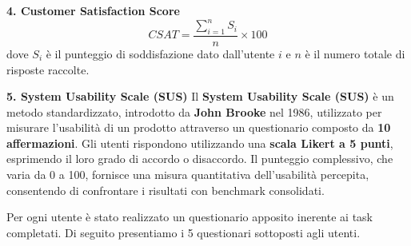 \vspace{0.5cm} %
\textbf{4. Customer Satisfaction Score}
\begin{equation}
	CSAT = \frac{\sum_{i=1}^{n} S_i}{n} \times 100
\end{equation}
dove \( S_i \) è il punteggio di soddisfazione dato dall'utente \( i \) e \( n \) è il numero totale di risposte raccolte.

\vspace{0.5cm} %
\textbf{5. System Usability Scale (SUS)}
\newline
\newline
Il \textbf{System Usability Scale (SUS)} è un metodo standardizzato, introdotto da \textbf{John Brooke} nel 1986, utilizzato per misurare l’usabilità di un prodotto attraverso un questionario composto da \textbf{10 affermazioni}. Gli utenti rispondono utilizzando una \textbf{scala Likert a 5 punti}, esprimendo il loro grado di accordo o disaccordo. Il punteggio complessivo, che varia da 0 a 100, fornisce una misura quantitativa dell’usabilità percepita, consentendo di confrontare i risultati con benchmark consolidati.
\vspace{0.5cm} %

Per ogni utente è stato realizzato un questionario apposito inerente ai task completati. Di seguito presentiamo i 5 questionari sottoposti agli utenti.

\vspace{0.5cm} %
